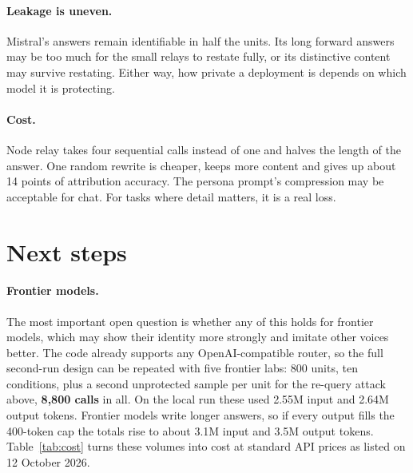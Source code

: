 \documentclass[11pt]{article}
\begin{document}
\paragraph{Leakage is uneven.} Mistral's answers remain identifiable in half the units. Its long forward answers may be too much for the small relays to restate fully, or its distinctive content may survive restating. Either way, how private a deployment is depends on which model it is protecting.

\paragraph{Cost.} Node relay takes four sequential calls instead of one and halves the length of the answer. One random rewrite is cheaper, keeps more content and gives up about 14 points of attribution accuracy. The persona prompt's compression may be acceptable for chat. For tasks where detail matters, it is a real loss.

\section{Next steps}
\label{sec:next}

\paragraph{Frontier models.} The most important open question is whether any of this holds for frontier models, which may show their identity more strongly and imitate other voices better. The code already supports any OpenAI-compatible router, so the full second-run design can be repeated with five frontier labs: 800 units, ten conditions, plus a second unprotected sample per unit for the re-query attack above, \textbf{8{,}800 calls} in all. On the local run these used 2.55M input and 2.64M output tokens. Frontier models write longer answers, so if every output fills the 400-token cap the totals rise to about 3.1M input and 3.5M output tokens. Table~\ref{tab:cost} turns these volumes into cost at standard API prices as listed on 12 October 2026.
\end{document}
